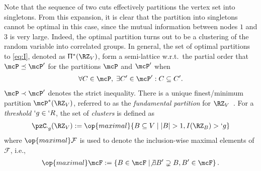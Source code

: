 \documentclass[conference,letterpaper]{IEEEtran}
\begin{document}
Note that the sequence of two cuts effectively partitions the vertex set into singletons. From this expansion, it is clear that the partition into singletons cannot be optimal in this case, since the mutual information between nodes $1$ and $3$ is very large. Indeed, the optimal partition turns out to be a clustering of the random variable into correlated groups. In general, the set of optimal partitions to \eqref{eq:I}, denoted as $\Uppi^*(\RZ_V)$, form a semi-lattice w.r.t.\ the partial order that $\mcP\preceq \mcP'$ for the
partitions $\mcP$ and $\mcP'$ when
\begin{align}
	\forall C\in \mcP, \;\exists C'\in \mcP' : C\subseteq C'.\label{eq:<P}
\end{align}
$\mcP\prec \mcP'$ denotes the strict inequality. There is a unique finest/minimum partition $\mcP^*(\RZ_V)$, referred to as
the \emph{fundamental partition} for $\RZ_V$~\cite[Theorem~5.2]{chan15mi}. 
%
For a \emph{threshold} $`g\in `R$, the set of \emph{clusters} is defined as~\cite[Definition~1]{chan16cluster}
\begin{align}
	\pzC_{`g}(\RZ_V):= \op{maximal}\Set{B\subseteq V \mid \abs{B}>1, I(\RZ_B)>`g}\label{eq:cluster}
\end{align}
where $\op{maximal} \mathcal{F}$ is used to denote the inclusion-wise maximal elements of
$\mathcal{F}$, i.e.,
\begin{align}
	\op{maximal} \mcF := \left\{ B \in \mcF \mid \not\exists B'\supsetneq B, B'\in \mcF \right\}.\label{eq:maximal}
\end{align}
\end{document}
